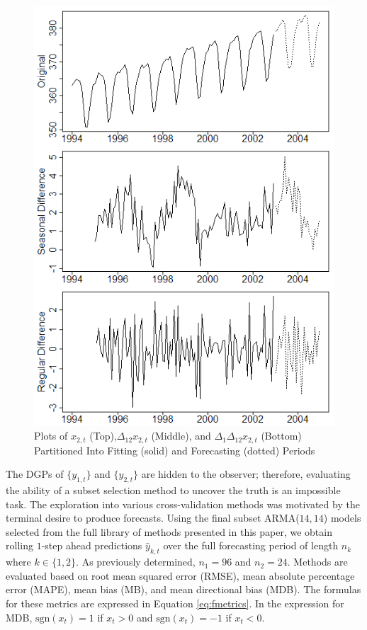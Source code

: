 \begin{figure}[htbp!]
	\centering
	\caption{Plots of $x_{2,t}$ (Top),$\Delta_{12}x_{2,t}$ (Middle), and $\Delta_1\Delta_{12}x_{2,t}$ (Bottom) Partitioned Into Fitting (solid) and Forecasting (dotted) Periods}
	\label{fig:co2plots2}
	\includegraphics[scale=0.8]{co2plots2}
\end{figure}


The DGPs of $\{y_{1,t}\}$ and $\{y_{2,t}\}$ are hidden to the observer; therefore, evaluating the ability of a subset selection method to uncover the truth is an impossible task. The exploration into various cross-validation methods was motivated by the terminal desire to produce forecasts. Using the final subset ARMA($14,14$) models selected from the full library of methods presented in this paper, we obtain rolling $1$-step ahead predictions $\hat{y}_{k,t}$ over the full forecasting period of length $n_k$ where $k\in\{1,2\}$. As previously determined, $n_1=96$ and $n_2=24$.  Methods are evaluated based on root mean squared error (RMSE), mean absolute percentage error (MAPE), mean bias (MB), and mean directional bias (MDB). The formulas for these metrics are expressed in Equation \ref{eq:fmetrics}. In the expression for MDB, $\textrm{sgn}(x_t)=1$ if $x_t>0$ and $\textrm{sgn}(x_t)=-1$ if $x_t<0$.

